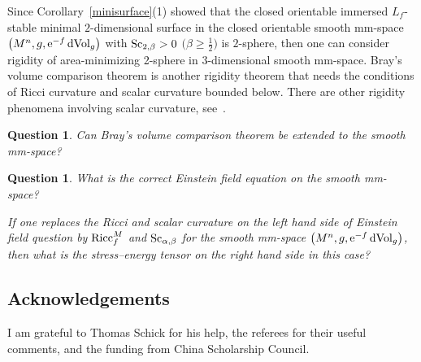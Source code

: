 \documentclass[pdftex]{sigma}
\newtheorem{Question}[Theorem]{Question}
\begin{document}
Since Corollary~\ref{minisurface}(1) showed that the closed orientable immersed $L_f$-stable minimal $2$-dimensional surface in the closed orientable smooth mm-space $\big(M^n,g, {\rm e}^{-f}\,{\rm dVol}_{g}\big)$ with ${\rm Sc}_{2, \beta}>0$ $\big(\beta\geq \frac{1}{2}\big)$ is $2$-sphere, then one can consider rigidity of area-minimizing 2-sphere
in $3$-dimensional smooth mm-space. Bray’s volume comparison theorem \cite[Chapter~3, Theorem~18]{MR2696584} is another rigidity theorem that needs the conditions of Ricci curvature and scalar curvature bounded below. There are other rigidity phenomena involving scalar curvature, see~\cite{MR3076061}.

\begin{Question}Can Bray’s volume comparison theorem be extended to the smooth mm-space?
\end{Question}

\begin{Question}What is the correct Einstein field equation on the smooth mm-space?

If one replaces the Ricci and scalar curvature on the left hand side of Einstein field question by ${\rm Ricc}^M_f$ and ${\rm Sc}_{\alpha, \beta}$ for the smooth mm-space $\big(M^n,g, {\rm e}^{-f}\,{\rm dVol}_{g}\big)$, then what is the stress–energy tensor on the right hand side in this case?
\end{Question}

\subsection*{Acknowledgements}
 I am grateful to Thomas Schick for his help, the referees for their useful comments, and the funding from China Scholarship Council.
\end{document}
